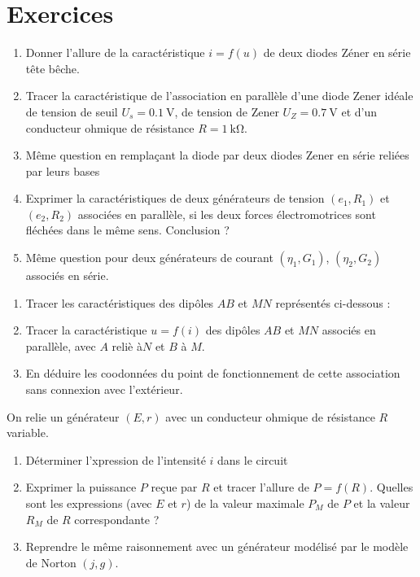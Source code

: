 \section{Exercices}
\begin{exercice}
	\begin{enumerate}
		\item Donner l'allure de la caractéristique $i=f(u)$ de deux diodes Zéner en série tête bêche.
		\item Tracer la caractéristique de l'association en parallèle d'une diode Zener idéale de tension de seuil $U_s=\SI{0.1}{\volt}$, de tension de Zener $U_Z = \SI{0.7}{\volt}$ et d'un conducteur ohmique de résistance $R=\SI{1}{\kilo\ohm}$.
		\item Même question en remplaçant la diode par deux diodes Zener en série reliées par leurs bases
		\item Exprimer la caractéristiques de deux générateurs de tension $(e_1, R_1)$ et $(e_2, R_2)$ associées en parallèle, si les deux forces électromotrices sont fléchées dans le même sens. Conclusion ?
		\item Même question pour deux générateurs de courant $(\eta_1, G_1)$, $(\eta_2, G_2)$ associés en série.
	\end{enumerate}
\end{exercice}
\begin{exercice}
	\begin{enumerate}
		\item Tracer les caractéristiques des dipôles $AB$ et $MN$ représentés ci-dessous :
		\item Tracer la caractéristique $u=f(i)$ des dipôles $AB$ et $MN$ associés en parallèle, avec $A$ reliè à$N$ et $B$ à $M$.
		\item En déduire les coodonnées du point de fonctionnement de cette association sans connexion avec l'extérieur.
	\end{enumerate}
\end{exercice}
		
\begin{exercice}
	On relie un générateur $(E, r)$ avec un conducteur ohmique de résistance $R$ variable.
	\begin{enumerate}
		\item Déterminer l'xpression de l'intensité $i$ dans le circuit
		\item Exprimer la puissance $P$ reçue par $R$ et tracer l'allure de $P=f(R)$. Quelles sont les expressions (avec $E$ et $r$) de la valeur maximale $P_M$ de $P$ et la valeur $R_M$ de $R$ correspondante ?
		\item Reprendre le même raisonnement avec un générateur modélisé par le modèle de Norton $(j, g)$.
	\end{enumerate}
\end{exercice}

